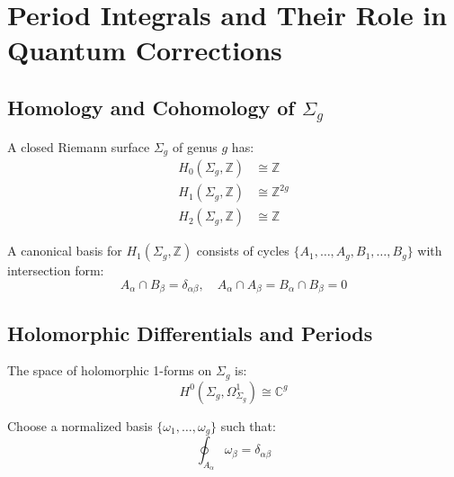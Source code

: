 
\section{Period Integrals and Their Role in Quantum Corrections}
\label{sec:period-integrals-quantum}

\subsection{Homology and Cohomology of $\Sigma_g$}

\begin{theorem}
\label{thm:topology-genus-g}
A closed Riemann surface $\Sigma_g$ of genus $g$ has:
\begin{align}
H_0(\Sigma_g, \mathbb{Z}) &\cong \mathbb{Z}\\
H_1(\Sigma_g, \mathbb{Z}) &\cong \mathbb{Z}^{2g}\\
H_2(\Sigma_g, \mathbb{Z}) &\cong \mathbb{Z}
\end{align}

A canonical basis for $H_1(\Sigma_g, \mathbb{Z})$ consists of cycles $\{A_1, \ldots, A_g, B_1, \ldots, B_g\}$ with intersection form:
\begin{equation}
A_\alpha \cap B_\beta = \delta_{\alpha\beta}, \quad A_\alpha \cap A_\beta = B_\alpha \cap B_\beta = 0
\end{equation}
\end{theorem}

\subsection{Holomorphic Differentials and Periods}

\begin{definition}
\label{def:holomorphic-differentials}
The space of holomorphic 1-forms on $\Sigma_g$ is:
\begin{equation}
H^0(\Sigma_g, \Omega^1_{\Sigma_g}) \cong \mathbb{C}^g
\end{equation}

Choose a normalized basis $\{\omega_1, \ldots, \omega_g\}$ such that:
\begin{equation}
\oint_{A_\alpha} \omega_\beta = \delta_{\alpha\beta}
\end{equation}
\end{definition}

